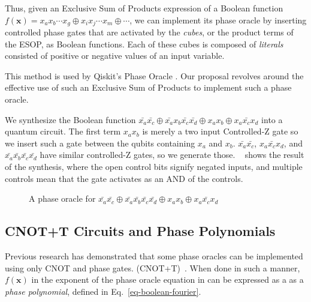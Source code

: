 Thus, given an Exclusive Sum of Products expression of a Boolean function
$f(\mathbf{x}) = x_a x_b \cdots x_g \oplus x_i x_j \cdots x_m \oplus \cdots$, we
can implement its phase oracle by inserting controlled phase gates that are activated
by the {\it cubes}, or the product terms of the ESOP, as Boolean functions. Each of these
cubes is composed of {\it literals} consisted of positive or negative values of an input variable.

This method is used by Qiskit's Phase Oracle \cite{bib-phaseoracle}. Our proposal revolves around
the effective use of such an Exclusive Sum of Products to implement such a phase oracle.

\begin{example}
  \label{ex-esop-synth}
  We synthesize the Boolean function
  $\bar{x_a}\bar{x_c} \oplus \bar{x_a} x_b \bar{x_c}\bar{x_d} \oplus x_a x_b \oplus x_a \bar{x_c} x_d$
  into a quantum circuit. The first term $x_a x_b$ is merely a two input Controlled-Z gate so we insert
  such a gate between the qubits containing $x_a$ and $x_b$. $\bar{x_a}\bar{x_c}$, $x_a \bar{x_c} x_d$, and
  $\bar{x_a}\bar{x_b}\bar{x_c}\bar{x_d}$ have similar controlled-Z gates, so we generate those.
  ~ shows the result of the synthesis, where the open control bits signify negated
  inputs, and multiple controls mean that the gate activates as an AND of the controls.
\end{example}

\begin{figure}[t]
 \centering
  \scalebox{1.0} {
    
  }
  \caption{A phase oracle for $\bar{x_a}\bar{x_c} \oplus \bar{x_a}\bar{x_b}\bar{x_c}\bar{x_d} \oplus x_a x_b \oplus x_a \bar{x_c} x_d$}
  \label{fig-esop-synth}

\end{figure}

\subsection{CNOT+T Circuits and Phase Polynomials}
\label{Pre:CnotPhase}

Previous research has demonstrated that some phase oracles can be implemented using only
CNOT and phase gates.
(CNOT+T)~\cite{bib-amy-cnot}. When done in such a manner, $f(\mathbf{x})$ in the exponent
of the phase oracle equation in  can be expressed as a 
as a {\it phase polynomial},
defined in Eq.~\ref{eq-boolean-fourier}.

